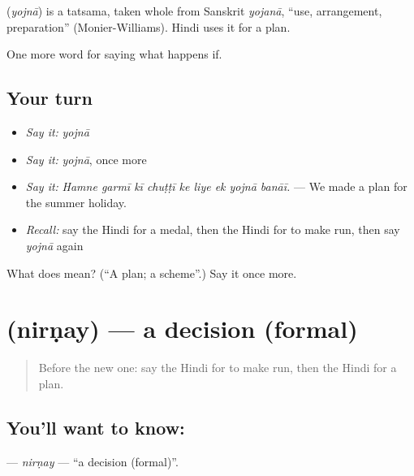 \begin{cousinweb}
\textbf{} (\emph{yojnā}) is a tatsama, taken whole from Sanskrit \emph{yojanā}, \textquotedblleft{}use, arrangement, preparation\textquotedblright{} (Monier-Williams). Hindi uses it for a plan.
\end{cousinweb}

\begin{grammarlens}[title={What you've built}]
One more word for saying what happens if.
\end{grammarlens}

\subsection*{Your turn}
\begin{itemize}
\raggedright
  \item \emph{Say it:} \emph{yojnā}
  \item \emph{Say it:} \emph{yojnā}, once more
  \item \emph{Say it:} \emph{Hamne garmī kī chuṭṭī ke liye ek yojnā banāī.} — We made a plan for the summer holiday.
  \item \emph{Recall:} say the Hindi for a medal, then the Hindi for to make run, then say \emph{yojnā} again
\end{itemize}

\begin{tcolorbox}[breakable,colback=teal!4,colframe=teal!35!black,title={Before you move on}]
What does  mean? (\textquotedblleft{}A plan; a scheme\textquotedblright{}.) Say it once more.
\end{tcolorbox}
\section[\texorpdfstring{\hi{निर्णय} (nirṇay)}{निर्णय (nirṇay)}]{ (nirṇay) — a decision (formal)}

\label{lesson:HI-C536-nirnay}



\begin{quote}
Before the new one: say the Hindi for to make run, then the Hindi for a plan.
\end{quote}

\subsection*{You'll want to know: }
\textbf{} — \emph{nirṇay} — \textquotedblleft{}a decision (formal)\textquotedblright{}.


